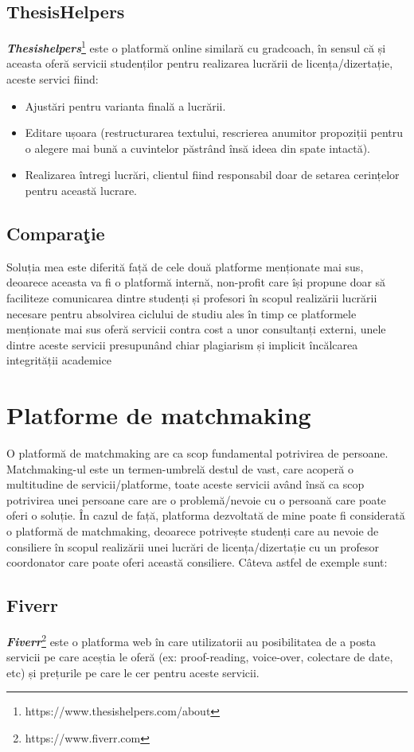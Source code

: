\documentclass[12pt,a4paper,hidelinks]{report}
\theoremstyle{definition}
\theoremstyle{remark}
\begin{document}
\subsection{ThesisHelpers}
\textbf{\textit{Thesishelpers}}\footnote[2]{https://www.thesishelpers.com/about} este o platformă online similară cu gradcoach, în sensul că și aceasta oferă servicii studenților pentru realizarea lucrării de licența/dizertație, aceste servici fiind: 
\begin{itemize}
    \item Ajustări pentru varianta finală a lucrării.
    \item Editare ușoara (restructurarea textului, rescrierea anumitor propoziții pentru o alegere mai bună a cuvintelor păstrând însă ideea din spate intactă).
    \item Realizarea întregi lucrări, clientul fiind responsabil doar de setarea cerințelor pentru această lucrare.
\end{itemize} 
\subsection{Compara\c tie}
Soluția mea este diferită față de cele două platforme menționate mai sus, deoarece aceasta va fi o platformă internă, non-profit care își propune doar să faciliteze comunicarea dintre studenți și profesori în scopul realizării lucrării necesare pentru absolvirea ciclului de studiu ales în timp ce platformele menționate mai sus oferă servicii contra cost a unor consultanți externi, unele dintre aceste servicii presupunând chiar plagiarism și implicit încălcarea integrității academice
\section{Platforme de matchmaking}
O platformă de matchmaking are ca scop fundamental potrivirea de persoane. Matchmaking-ul este un termen-umbrelă destul de vast, care acoperă o multitudine de servicii/platforme, toate aceste servicii având însă ca scop potrivirea unei persoane care are o problemă/nevoie cu o persoană care poate oferi o soluție. În cazul de față, platforma dezvoltată de mine poate fi considerată o platformă de matchmaking, deoarece potrivește studenți care au nevoie de consiliere în scopul realizării unei lucrări de licența/dizertație cu un profesor coordonator care poate oferi această consiliere.
Câteva astfel de exemple sunt:
\subsection{Fiverr}
\textbf{\textit{Fiverr}}\footnote[1]{https://www.fiverr.com} este o platforma web în care utilizatorii au posibilitatea de a posta servicii pe care aceștia le oferă (ex: proof-reading, voice-over, colectare de date, etc) și prețurile pe care le cer pentru aceste servicii.
\end{document}

